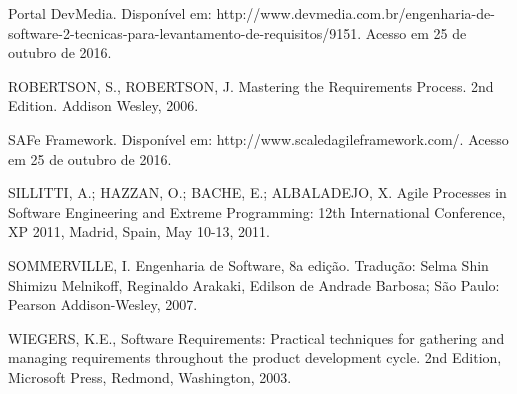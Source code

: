 Portal DevMedia. Disponível em: http://www.devmedia.com.br/engenharia-de-software-2-tecnicas-para-levantamento-de-requisitos/9151. Acesso em 25 de outubro de 2016.

ROBERTSON, S., ROBERTSON, J. Mastering the Requirements Process. 2nd Edition. Addison Wesley, 2006.

SAFe Framework. Disponível em: http://www.scaledagileframework.com/. Acesso em 25 de outubro de 2016.

SILLITTI, A.; HAZZAN, O.; BACHE, E.; ALBALADEJO, X. Agile Processes in Software Engineering and Extreme Programming: 12th International Conference, XP 2011, Madrid, Spain, May 10-13, 2011.

SOMMERVILLE, I. Engenharia de Software, 8a edição. Tradução: Selma Shin Shimizu Melnikoff, Reginaldo Arakaki, Edilson de Andrade Barbosa; São Paulo: Pearson Addison-Wesley, 2007.

WIEGERS, K.E., Software Requirements: Practical techniques for gathering and managing requirements throughout the product development cycle. 2nd Edition, Microsoft Press, Redmond, Washington, 2003. 



